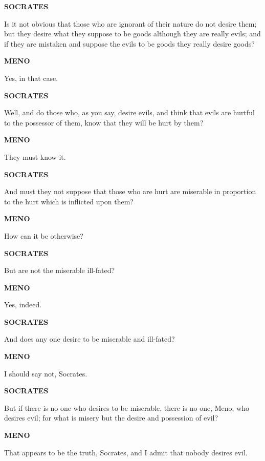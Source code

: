 \documentclass[11pt,letter]{article}
\begin{document}
\par \textbf{SOCRATES}
\par   Is it not obvious that those who are ignorant of their nature do not desire them; but they desire what they suppose to be goods although they are really evils; and if they are mistaken and suppose the evils to be goods they really desire goods?

\par \textbf{MENO}
\par   Yes, in that case.

\par \textbf{SOCRATES}
\par   Well, and do those who, as you say, desire evils, and think that evils are hurtful to the possessor of them, know that they will be hurt by them?

\par \textbf{MENO}
\par   They must know it.

\par \textbf{SOCRATES}
\par   And must they not suppose that those who are hurt are miserable in proportion to the hurt which is inflicted upon them?

\par \textbf{MENO}
\par   How can it be otherwise?

\par \textbf{SOCRATES}
\par   But are not the miserable ill-fated?

\par \textbf{MENO}
\par   Yes, indeed.

\par \textbf{SOCRATES}
\par   And does any one desire to be miserable and ill-fated?

\par \textbf{MENO}
\par   I should say not, Socrates.

\par \textbf{SOCRATES}
\par   But if there is no one who desires to be miserable, there is no one, Meno, who desires evil; for what is misery but the desire and possession of evil?

\par \textbf{MENO}
\par   That appears to be the truth, Socrates, and I admit that nobody desires evil.
\end{document}
